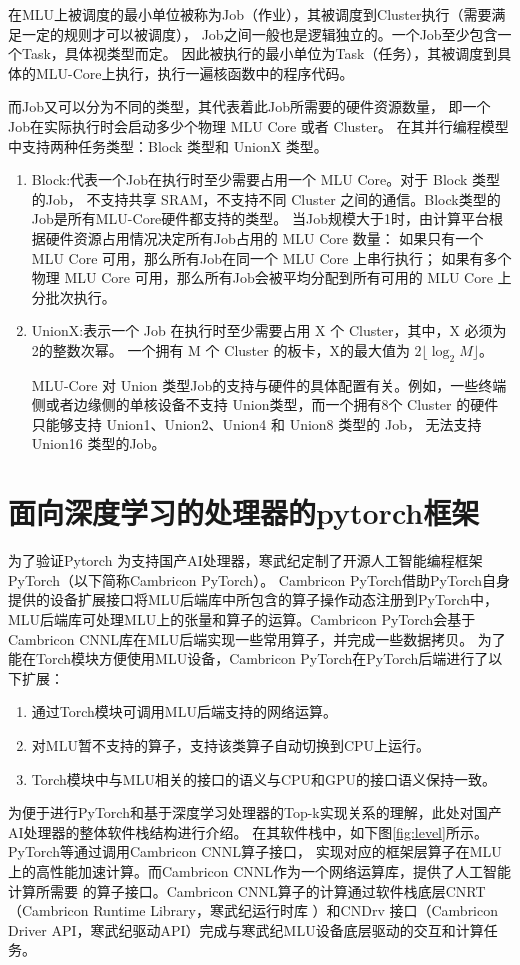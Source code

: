 在MLU上被调度的最小单位被称为Job（作业），其被调度到Cluster执行（需要满足一定的规则才可以被调度），
Job之间一般也是逻辑独立的。一个Job至少包含一个Task，具体视类型而定。
因此被执行的最小单位为Task（任务），其被调度到具体的MLU-Core上执行，执行一遍核函数中的程序代码。

而Job又可以分为不同的类型，其代表着此Job所需要的硬件资源数量，
即一个Job在实际执行时会启动多少个物理 MLU Core 或者 Cluster。
在其并行编程模型中支持两种任务类型：Block 类型和 UnionX 类型。
\begin{enumerate}

    \item{Block}:代表一个Job在执行时至少需要占用一个 MLU Core。对于 Block 类型的Job，
    不支持共享 SRAM，不支持不同 Cluster 之间的通信。Block类型的Job是所有MLU-Core硬件都支持的类型。
    当Job规模大于1时，由计算平台根据硬件资源占用情况决定所有Job占用的 MLU Core 数量：
    如果只有一个 MLU Core 可用，那么所有Job在同一个 MLU Core 上串行执行；
    如果有多个物理 MLU Core 可用，那么所有Job会被平均分配到所有可用的 MLU Core 上分批次执行。
    \item {UnionX}:表示一个 Job 在执行时至少需要占用 X 个 Cluster，其中，X 必须为2的整数次幂。
    一个拥有 M 个 Cluster 的板卡，X的最大值为 \(2\lfloor\log_2 M\rfloor\)。

    MLU-Core 对 Union 类型Job的支持与硬件的具体配置有关。例如，一些终端侧或者边缘侧的单核设备不支持 
    Union类型，而一个拥有8个 Cluster 的硬件只能够支持 Union1、Union2、Union4 和 Union8 类型的 Job，
    无法支持 Union16 类型的Job。
    

\end{enumerate}



\section{面向深度学习的处理器的pytorch框架}
为了验证Pytorch
为支持国产AI处理器，寒武纪定制了开源人工智能编程框架PyTorch（以下简称Cambricon PyTorch）。
Cambricon PyTorch借助PyTorch自身提供的设备扩展接口将MLU后端库中所包含的算子操作动态注册到PyTorch中，MLU后端库可处理MLU上的张量和算子的运算。Cambricon PyTorch会基于Cambricon CNNL库在MLU后端实现一些常用算子，并完成一些数据拷贝。
为了能在Torch模块方便使用MLU设备，Cambricon PyTorch在PyTorch后端进行了以下扩展：
\begin{enumerate} 
\item 通过Torch模块可调用MLU后端支持的网络运算。

\item 对MLU暂不支持的算子，支持该类算子自动切换到CPU上运行。

\item Torch模块中与MLU相关的接口的语义与CPU和GPU的接口语义保持一致。
\end{enumerate}
为便于进行PyTorch和基于深度学习处理器的Top-k实现关系的理解，此处对国产AI处理器的整体软件栈结构进行介绍。
在其软件栈中，如下图\ref{fig:level}所示。
PyTorch等通过调用Cambricon CNNL算子接口，
实现对应的框架层算子在MLU上的高性能加速计算。而Cambricon CNNL作为一个网络运算库，提供了人工智能计算所需要
的算子接口。Cambricon CNNL算子的计算通过软件栈底层CNRT（Cambricon Runtime Library，寒武纪运行时库
）和CNDrv 接口（Cambricon Driver API，寒武纪驱动API）完成与寒武纪MLU设备底层驱动的交互和计算任务。


